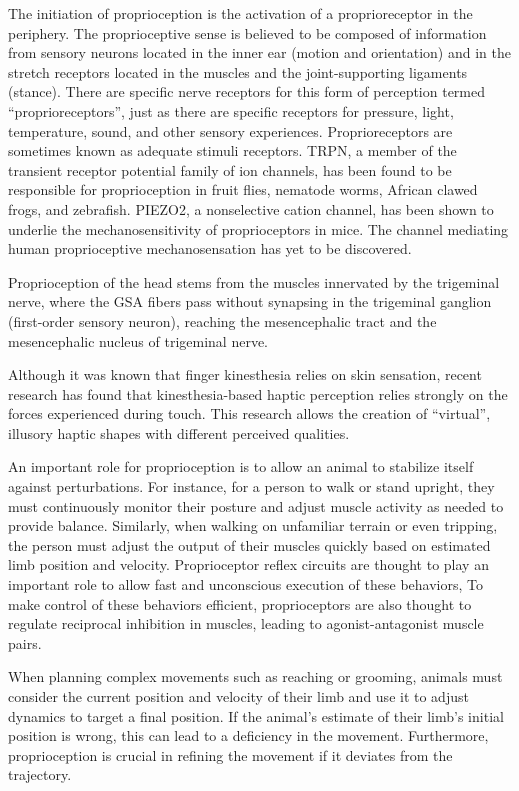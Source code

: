 The initiation of proprioception is the activation of a proprioreceptor in the periphery. The proprioceptive sense is believed to be composed of information from sensory neurons located in the inner ear (motion and orientation) and in the stretch receptors located in the muscles and the joint-supporting ligaments (stance). There are specific nerve receptors for this form of perception termed ``proprioreceptors'', just as there are specific receptors for pressure, light, temperature, sound, and other sensory experiences. Proprioreceptors are sometimes known as adequate stimuli receptors. TRPN, a member of the transient receptor potential family of ion channels, has been found to be responsible for proprioception in fruit flies, nematode worms, African clawed frogs, and zebrafish. PIEZO2, a nonselective cation channel, has been shown to underlie the mechanosensitivity of proprioceptors in mice. The channel mediating human proprioceptive mechanosensation has yet to be discovered.

Proprioception of the head stems from the muscles innervated by the trigeminal nerve, where the GSA fibers pass without synapsing in the trigeminal ganglion (first-order sensory neuron), reaching the mesencephalic tract and the mesencephalic nucleus of trigeminal nerve.

Although it was known that finger kinesthesia relies on skin sensation, recent research has found that kinesthesia-based haptic perception relies strongly on the forces experienced during touch. This research allows the creation of ``virtual'', illusory haptic shapes with different perceived qualities.

An important role for proprioception is to allow an animal to stabilize itself against perturbations. For instance, for a person to walk or stand upright, they must continuously monitor their posture and adjust muscle activity as needed to provide balance. Similarly, when walking on unfamiliar terrain or even tripping, the person must adjust the output of their muscles quickly based on estimated limb position and velocity. Proprioceptor reflex circuits are thought to play an important role to allow fast and unconscious execution of these behaviors, To make control of these behaviors efficient, proprioceptors are also thought to regulate reciprocal inhibition in muscles, leading to agonist-antagonist muscle pairs.

When planning complex movements such as reaching or grooming, animals must consider the current position and velocity of their limb and use it to adjust dynamics to target a final position. If the animal's estimate of their limb's initial position is wrong, this can lead to a deficiency in the movement. Furthermore, proprioception is crucial in refining the movement if it deviates from the trajectory.

